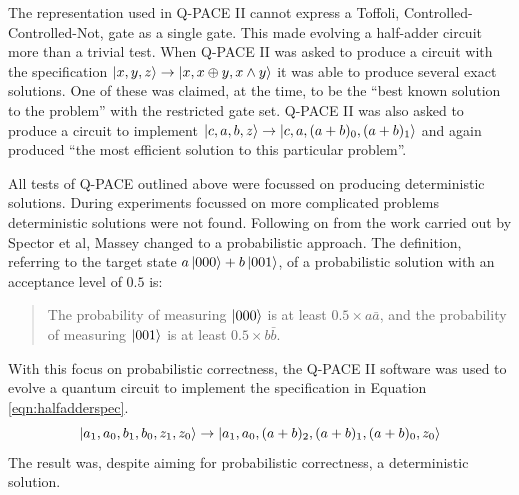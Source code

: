The representation used in Q-PACE II cannot express a Toffoli, Controlled-Controlled-Not, gate as a single gate.
This made evolving a half-adder circuit more than a trivial test.
When Q-PACE II was asked to produce a circuit with the specification $\left\vert{x, y, z}\right\rangle\rightarrow\left\vert{x,x \oplus y, x \wedge y}\right\rangle$ it was able to produce several exact solutions.
One of these was claimed, at the time, to be the ``best known solution to the problem''\cite{masseythesis} with the restricted gate set.
Q-PACE II was also asked to produce a circuit to implement $\left\vert{c, a, b, z}\right\rangle\rightarrow\left\vert{c, a, (a+b)_0, (a+b)_1}\right\rangle$ and again produced ``the most efficient solution to this particular problem''\cite{masseythesis}.


All tests of Q-PACE outlined above were focussed on producing deterministic solutions.
During experiments focussed on more complicated problems deterministic solutions were not found.
Following on from the work carried out by Spector et al\cite{LSpectorGPforQC,LSpectorANDOR,Spector:1999:QCA:316573.317112}, Massey changed to a probabilistic approach.
The definition, referring to the target state $a\left\vert{000}\right\rangle+b\left\vert{001}\right\rangle$, of a probabilistic solution with an acceptance level of $0.5$ is:

\begin{quote}
The probability of measuring $\left\vert{000}\right\rangle$ is at least $0.5 \times a\bar{a}$, and the probability of measuring $\left\vert{001}\right\rangle$ is at least $0.5 \times b\bar{b}$.\cite{masseythesis}
\end{quote}

With this focus on probabilistic correctness, the Q-PACE II software was used to evolve a quantum circuit to implement the specification in Equation \ref{eqn:halfadderspec}.
\begin{equation}
 \left\vert{a_1, a_0, b_1, b_0, z_1, z_0}\right\rangle \rightarrow \left\vert{a_1, a_0, (a+b)_2, (a+b)_1, (a+b)_0, z_0}\right\rangle
 \label{eqn:halfadderspec}
\end{equation}
The result was, despite aiming for probabilistic correctness, a deterministic solution\cite{masseythesis}.


